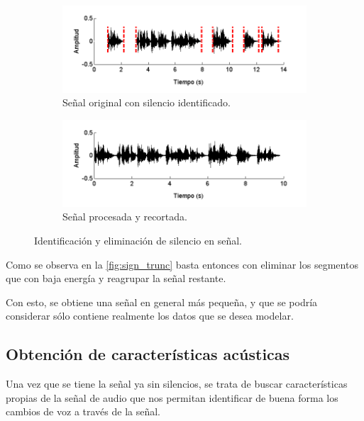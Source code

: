 \begin{figure}[ht]
  \begin{subfigure}[b]{\textwidth}
    \includegraphics[width=0.9\linewidth]{gfx/chap2/signal-silence}
    \caption{Señal original con silencio identificado.}
    \label{fig:sign_silence}  
  \end{subfigure}

  \begin{subfigure}[b]{\textwidth}
    \includegraphics[width=0.9\linewidth]{gfx/chap2/signal-trunc}
    \caption{Señal procesada y recortada.}
    \label{fig:sign_trunc}  
  \end{subfigure}
  
  \caption{Identificación y eliminación de silencio en señal.}  
  \label{fig:sign_ident}  
\end{figure}

Como se observa en la \autoref{fig:sign_trunc} basta entonces con eliminar los segmentos que con baja energía y reagrupar la señal restante.

Con esto, se obtiene una señal en general más pequeña, y que se podría  considerar sólo contiene realmente los datos que se desea modelar.

\subsection{Obtención de características acústicas}

Una vez que se tiene la señal ya sin silencios, se trata de buscar características propias de la señal de audio que nos permitan identificar de buena forma los cambios de voz a través de la señal.

